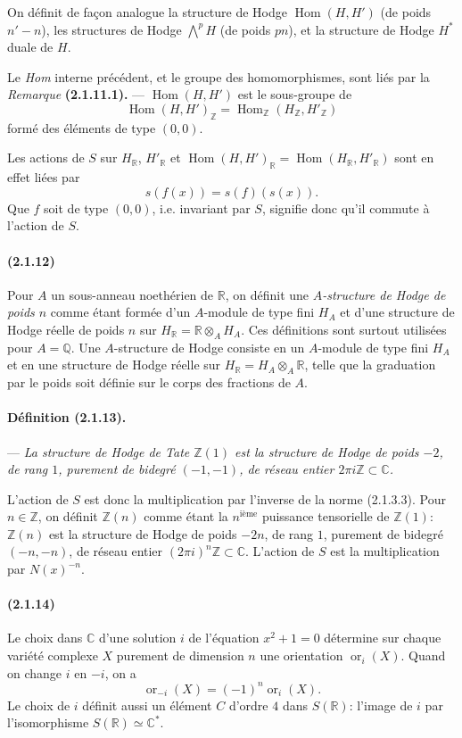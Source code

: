 \documentclass[10pt]{article}
\newcommand{\C}{\mathbb C}
\newcommand{\Q}{\mathbb Q}
\newcommand{\Z}{\mathbb Z}
\newcommand{\Hom}{\operatorname{Hom}}
\newcommand{\fg}{\guillemotright}
\newcommand{\og}{\guillemotleft}
\newcommand{\R}{\mathbb R}
\newcommand{\ornt}{\operatorname{or}}
\begin{document}
On définit de façon analogue la structure de Hodge $\Hom(H,H')$ (de poids $n'-n$), les structures de Hodge $\bigwedge^p H$ (de poids $pn$), et la structure de Hodge $H^*$ duale de $H$.

Le \og \emph{Hom} interne\fg{} précédent, et le groupe des homomorphismes, sont liés par la \emph{Remarque} \textbf{(2.1.11.1).} --- $\Hom(H,H')$ est le sous-groupe de
\[
\Hom(H,H')_\Z=\Hom_\Z(H_\Z,H'_\Z)
\]
formé des éléments de type $(0,0)$.

Les actions de $S$ sur $H_\R$, $H'_\R$ et $\Hom(H,H')_\R=\Hom(H_\R,H'_\R)$ sont en effet liées par
\[
s(f(x))=s(f)(s(x)).
\]
Que $f$ soit de type $(0,0)$, i.e. invariant par $S$, signifie donc qu'il commute à l'action de $S$.

\paragraph{(2.1.12)} Pour $A$ un sous-anneau noethérien de $\R$, on définit une \emph{$A$-structure de Hodge de poids $n$} comme étant formée d'un $A$-module de type fini $H_A$ et d'une structure de Hodge réelle de poids $n$ sur $H_\R=\R\otimes_AH_A$. Ces définitions sont surtout utilisées pour $A=\Q$. Une $A$-structure de Hodge consiste en un $A$-module de type fini $H_A$ et en une structure de Hodge réelle sur $H_\R=H_A\otimes_A\R$, telle que la graduation par le poids soit définie sur le corps des fractions de $A$.

\paragraph{Définition (2.1.13).} --- \emph{La structure de Hodge de Tate $\Z(1)$ est la structure de Hodge de poids $-2$, de rang $1$, purement de bidegré $(-1,-1)$, de réseau entier $2\pi i\Z\subset\C$.}

L'action de $S$ est donc la multiplication par l'inverse de la norme (2.1.3.3). Pour $n\in\Z$, on définit $\Z(n)$ comme étant la $n^{\text{ième}}$ puissance tensorielle de $\Z(1)$: $\Z(n)$ est la structure de Hodge de poids $-2n$, de rang $1$, purement de bidegré $(-n,-n)$, de réseau entier $(2\pi i)^n\Z\subset\C$. L'action de $S$ est la multiplication par $N(x)^{-n}$.

\paragraph{(2.1.14)} Le choix dans $\C$ d'une solution $i$ de l'équation $x^2+1=0$ détermine sur chaque variété complexe $X$ purement de dimension $n$ une orientation $\ornt_i(X)$. Quand on change $i$ en $-i$, on a
\[
\ornt_{-i}(X)=(-1)^n\ornt_i(X).
\]
Le choix de $i$ définit aussi un élément $C$ d'ordre $4$ dans $S(\R)$: l'image de $i$ par l'isomorphisme $S(\R)\simeq\C^*$.
\end{document}
